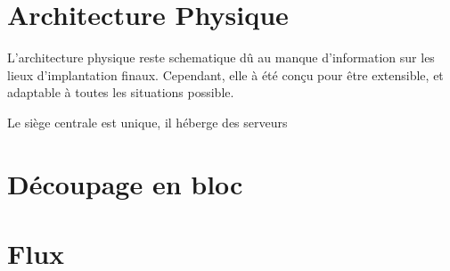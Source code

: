 \section{Architecture Physique}

    L'architecture physique reste schematique dû au manque d'information sur les lieux d'implantation finaux.
    Cependant, elle à été conçu pour être extensible, et adaptable à toutes les situations possible.
    
    Le siège centrale est unique, il héberge des serveurs

\section{Découpage en bloc}

\section{Flux}
